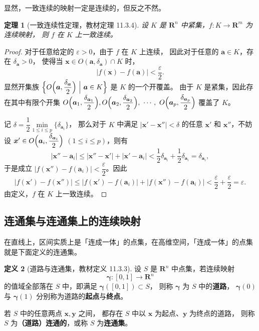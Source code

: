 \documentclass[11pt]{ctexart}
\theoremstyle{plain}
\newtheorem{thm}{定理}[section]
\theoremstyle{definition}
\newtheorem{defn}[thm]{定义}
\theoremstyle{remark}
\begin{document}
显然，一致连续的映射一定是连续的，但反之不然。

\begin{thm}[一致连续性定理，教材定理 11.3.4]\label{thm:unifcontthm}
设 \(K\) 是 \(\mathbf{R}^n\) 中紧集，\(f\colon K\to\mathbf{R}^m\) 为连续映射，
则 \(f\) 在 \(K\) 上一致连续。
\end{thm}

\begin{proof}
对于任意给定的 \(\varepsilon>0\)，由于 \(f\) 在 \(K\) 上连续，
因此对于任意的 \(\boldsymbol{a}\in K\)，存在 \(\delta_{\boldsymbol{a}}>0\)，
使得当 \(\boldsymbol{x}\in O(\boldsymbol{a},\delta_{\boldsymbol{a}})\cap K\) 时，
\[
  |f(\boldsymbol{x})-f(\boldsymbol{a})|<\frac{\varepsilon}{2}.
\]
显然开集族
\(\Bigl\{O\Bigl(\boldsymbol{a},\dfrac{\delta_{\boldsymbol{a}}}{2}\Bigr)
\ \Big|\ \boldsymbol{a}\in K\Bigr\}\) 是 \(K\) 的一个开覆盖。
由于 \(K\) 是紧集，因此存在其中有限个开集
$O\Bigl(\boldsymbol{a}_1,\dfrac{\delta_{\boldsymbol{a}_1}}{2}\Bigr),
 O\Bigl(\boldsymbol{a}_2,\dfrac{\delta_{\boldsymbol{a}_2}}{2}\Bigr),\ \cdots,\
 O\Bigl(\boldsymbol{a}_p,\dfrac{\delta_{\boldsymbol{a}_p}}{2}\Bigr)$
覆盖了 \(K\)。

记 \(\delta=\dfrac{1}{2}\min\limits_{1\le i\le p}\{\delta_{\boldsymbol{a}_i}\}\)，
那么对于 \(K\) 中满足 \(|\boldsymbol{x}'-\boldsymbol{x}''|<\delta\) 的任意
\(\boldsymbol{x}'\) 和 \(\boldsymbol{x}''\)，不妨设
\(\boldsymbol{x}'\in O\Bigl(\boldsymbol{a}_i,\dfrac{\delta_{\boldsymbol{a}_i}}{2}\Bigr)\)
\((1\le i\le p)\)，则有
\[
  |\boldsymbol{x}''-\boldsymbol{a}_i|
  \le|\boldsymbol{x}''-\boldsymbol{x}'|+|\boldsymbol{x}'-\boldsymbol{a}_i|
  <\frac{1}{2}\delta_{\boldsymbol{a}_i}+\frac{1}{2}\delta_{\boldsymbol{a}_i}
  =\delta_{\boldsymbol{a}_i},
\]
于是成立 \(|f(\boldsymbol{x}'')-f(\boldsymbol{a}_i)|<\dfrac{\varepsilon}{2}\)。因此
\[
  |f(\boldsymbol{x}')-f(\boldsymbol{x}'')|
  \le|f(\boldsymbol{x}')-f(\boldsymbol{a}_i)|+|f(\boldsymbol{x}'')-f(\boldsymbol{a}_i)|
  <\frac{\varepsilon}{2}+\frac{\varepsilon}{2}=\varepsilon .
\]
由定义，\(f\) 在 \(K\) 上一致连续。
\end{proof}

\subsection{连通集与连通集上的连续映射}

在直线上，区间实质上是「连成一体」的点集，在高维空间，「连成一体」的点集
就是下面定义的连通集。

\begin{defn}[道路与连通集，教材定义 11.3.3]\label{def:connected}
设 \(S\) 是 \(\mathbf{R}^n\) 中点集，若连续映射
\[
  \boldsymbol{\gamma}\colon[0,1]\to\mathbf{R}^n
\]
的值域全部落在 \(S\) 中，即满足 \(\boldsymbol{\gamma}([0,1])\subset S\)，
则称 \(\boldsymbol{\gamma}\) 为 \(S\) 中的\textbf{道路}，
\(\boldsymbol{\gamma}(0)\) 与 \(\boldsymbol{\gamma}(1)\) 分别称为道路的\textbf{起点}与\textbf{终点}。

若 \(S\) 中的任意两点 \(\boldsymbol{x},\boldsymbol{y}\) 之间，
都存在 \(S\) 中以 \(\boldsymbol{x}\) 为起点、\(\boldsymbol{y}\) 为终点的道路，
则称 \(S\) 为\textbf{（道路）连通的}，或称 \(S\) 为\textbf{连通集}。
\end{defn}
\end{document}
